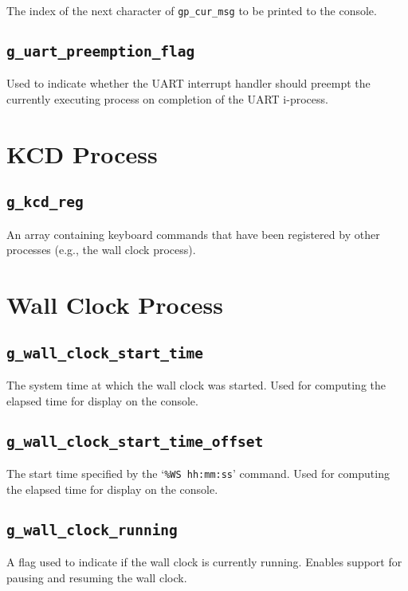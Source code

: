 \documentclass[12pt]{report}
\begin{document}
The index of the next character of \texttt{gp_cur_msg} to be printed to the console.

\subsection{\texttt{g_uart_preemption_flag}}

Used to indicate whether the UART interrupt handler should preempt the currently executing process on completion of the UART i-process.

\section{KCD Process}

\subsection{\texttt{g_kcd_reg}}

An array containing keyboard commands that have been registered by other processes (e.g., the wall clock process).

\section{Wall Clock Process}

\subsection{\texttt{g_wall_clock_start_time}}

The system time at which the wall clock was started. Used for computing the elapsed time for display on the console.

\subsection{\texttt{g_wall_clock_start_time_offset}}

The start time specified by the `\texttt{\%WS hh:mm:ss}' command. Used for computing the elapsed time for display on the console.

\subsection{\texttt{g_wall_clock_running}}

A flag used to indicate if the wall clock is currently running. Enables support for pausing and resuming the wall clock.
\end{document}
